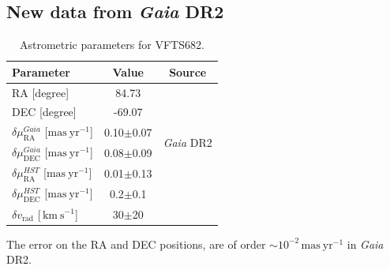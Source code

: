 \documentclass[apjl,twocolumn]{emulateapj}
\newcommand{\kms}{{\,\mathrm{km\ s^{-1}}}}
\DeclareRobustCommand{\Secref}[1]{Sec.~\ref{#1}}
\begin{document}
\subsection{New data from \emph{Gaia} DR2  \label{data:gaia}}

\begin{table}
  \begin{center}
    \caption{Astrometric parameters for VFTS682. }
    \begin{tabular}{l|c|c}
      \hline
      \hline
      Parameter & Value & Source\\
      \hline
      RA \hfill[degree] &  \phantom{-}84.73 %
                        & \multirow{2}{*}{\cite{evans:11}}\\[5pt]
      DEC \hfill [degree] & -69.07 %
                        & \\[5pt]
      \hline
      $\delta\mu_\mathrm{RA}^{Gaia}$  \hfill[$\mathrm{mas\ yr^{-1}}$] & 0.10$\pm$0.07 & \multirow{2}{*}{\emph{Gaia} DR2}\\[5pt]
      $\delta\mu_\mathrm{DEC}^{Gaia}$  \hfill[$\mathrm{mas\ yr^{-1}}$] & 0.08$\pm$0.09 & \\[5pt]
      \hline
      $\delta\mu_\mathrm{RA}^{HST}$  \hfill[$\mathrm{mas\ yr^{-1}}$] & 0.01$\pm$0.13 & \multirow{2}{*}{\cite{platais:18}}\\[5pt]
      $\delta\mu_\mathrm{DEC}^{HST}$  \hfill[$\mathrm{mas\ yr^{-1}}$] &
                                                                        0.2$\pm$0.1 &
      \\[5pt]
      \hline
      $\delta v_\mathrm{rad}$  \hfill[$\kms$] & 30$\pm$20 & \cite{bestenlehner:11}\\
      \hline
    \end{tabular}
    \tablecomments
    {The error on the RA and DEC positions, are of order
      $\sim$$10^{-2}\,\mathrm{mas\ yr^{-1}}$ in \emph{Gaia}
      DR2. %
    }
  \end{center}
  \label{tab:vfts682}
\end{table}
\end{document}

